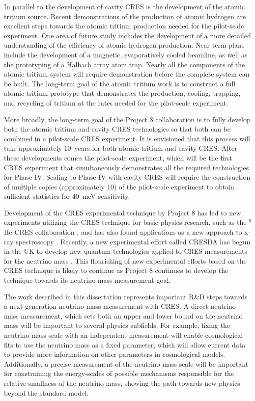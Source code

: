 In parallel to the development of cavity CRES is the development of the atomic tritium source. Recent demonstrations of the production of atomic hydrogen are excellent steps towards the atomic tritium production needed for the pilot-scale experiment. One area of future study includes the development of a more detailed understanding of the efficiency of atomic hydrogen production. Near-term plans include the development of a magnetic, evaporatively cooled beamline, as well as the prototyping of a Halbach array atom trap. Nearly all the components of the atomic tritium system will require demonstration before the complete system can be built. The long-term goal of the atomic tritium work is to construct a full atomic tritium prototype that demonstrates the production, cooling, trapping, and recycling of tritium at the rates needed for the pilot-scale experiment.

More broadly, the long-term goal of the Project 8 collaboration is to fully develop both the atomic tritium and cavity CRES technologies so that both can be combined in a pilot-scale CRES experiment. It is envisioned that this process will take approximately 10~years for both atomic tritium and cavity CRES. After these developments comes the pilot-scale experiment, which will be the first CRES experiment that simultaneously demonstrates all the required technologies for Phase IV. Scaling to Phase IV with cavity CRES will require the construction of multiple copies (approximately 10) of the pilot-scale experiment to obtain sufficient statistics for 40~meV sensitivity.

Development of the CRES experimental technique by Project 8 has led to new experiments utilizing the CRES technique for basic physics research, such as the $^6$He-CRES collaboration \cite{cresHe6}, and has also found applications as a new approach to x-ray spectroscopy \cite{cresXrayKazkaz}. Recently, a new experimental effort called CRESDA has begun in the UK to develop new quantum technologies applied to CRES measurements for the neutrino mass \cite{cresda}. This flourishing of new experimental efforts based on the CRES technique is likely to continue as Project 8 continues to develop the technique towards its neutrino mass measurement goal.

The work described in this dissertation represents important R\&D steps towards a next-generation neutrino mass measurement with CRES. A direct neutrino mass measurement, which sets both an upper and lower bound on the neutrino mass will be important to several physics subfields. For example, fixing the neutrino mass scale with an independent measurement will enable cosmological fits to use the neutrino mass as a fixed parameter, which will allow current data to provide more information on other parameters in cosmological models. Additionally, a precise measurement of the neutrino mass scale will be important for constraining the energy-scales of possible mechanisms responsible for the relative smallness of the neutrino mass, showing the path towards new physics beyond the standard model. 

